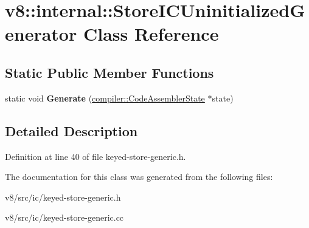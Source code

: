 \hypertarget{classv8_1_1internal_1_1StoreICUninitializedGenerator}{}\section{v8\+:\+:internal\+:\+:Store\+I\+C\+Uninitialized\+Generator Class Reference}
\label{classv8_1_1internal_1_1StoreICUninitializedGenerator}
\subsection*{Static Public Member Functions}
\begin{DoxyCompactItemize}
\item 
\mbox{\label{classv8_1_1internal_1_1StoreICUninitializedGenerator_a7836d12d7fb610f0024cd43d1fd4f826}} 
static void {\bfseries Generate} (\mbox{\hyperlink{classv8_1_1internal_1_1compiler_1_1CodeAssemblerState}{compiler\+::\+Code\+Assembler\+State}} $\ast$state)
\end{DoxyCompactItemize}


\subsection{Detailed Description}


Definition at line 40 of file keyed-\/store-\/generic.\+h.



The documentation for this class was generated from the following files\+:\begin{DoxyCompactItemize}
\item 
v8/src/ic/keyed-\/store-\/generic.\+h\item 
v8/src/ic/keyed-\/store-\/generic.\+cc\end{DoxyCompactItemize}
